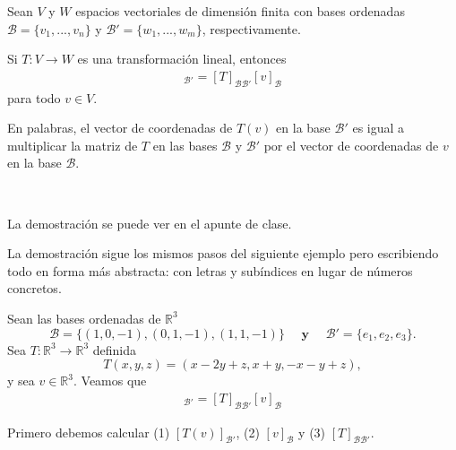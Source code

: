 \documentclass[handout]{beamer} %
\newcommand{\R}{\mathbb R}
\newcommand{\cB}{\mathcal{B}}
\begin{document}
    
\begin{frame}

    \begin{proposicion}
    Sean $V$ y $W$ espacios vectoriales de dimensión finita con bases ordenadas $\cB=\{v_1, ..., v_n\}$ y $\cB'=\{w_1, ..., w_m\}$, respectivamente. 
    
    Si $T:V\longrightarrow W$ es una transformación lineal, entonces
    \begin{align*}
    [T(v)]_{\cB'}=[T]_{\cB\cB'}[v]_{\cB}
    \end{align*}
    para todo $v\in V$.
    \end{proposicion}
    \pause
    En palabras, el vector de coordenadas de $T(v)$ en la base $\cB'$ es igual a multiplicar la matriz de $T$ en las bases $\cB$ y $\cB'$ por el vector de coordenadas de $v$ en la base $\cB$.
    
    \
    
    
    
    \end{frame}
    
    \begin{frame}
    La demostración se puede ver en el apunte de clase.
    \pause
    \
    
    La demostración sigue los mismos pasos del siguiente ejemplo pero escribiendo todo en forma más abstracta: con letras y subíndices en lugar de números concretos.
    \end{frame}
    
    

    
    \begin{frame}
        \begin{ejemplo}
            Sean las bases ordenadas de $\R^3$
            $$\cB = \{(1,0,-1),(0,1,-1),(1,1,-1)\}\quad \textbf{ y } \quad\cB' = \{e_1,e_2,e_3\}.$$ 
            Sea $T: \R^3 \to \R^3$ definida
            $$
            T(x,y,z) = (x-2y+z, x+y, -x-y+z),
            $$ 
            y sea $v \in \R^3$. Veamos  que 
        \begin{align*}
            [T(v)]_{\cB'}=[T]_{\cB\cB'}[v]_{\cB}
            \end{align*}
        \end{ejemplo}\pause
        \begin{solucion}\pause
            Primero debemos calcular (1) $[T(v)]_{\cB'}$,\; (2) $[v]_{\cB}$\; y \;(3) $[T]_{\cB\cB'}$.
        \end{solucion}	
    \end{frame}
\end{document}
